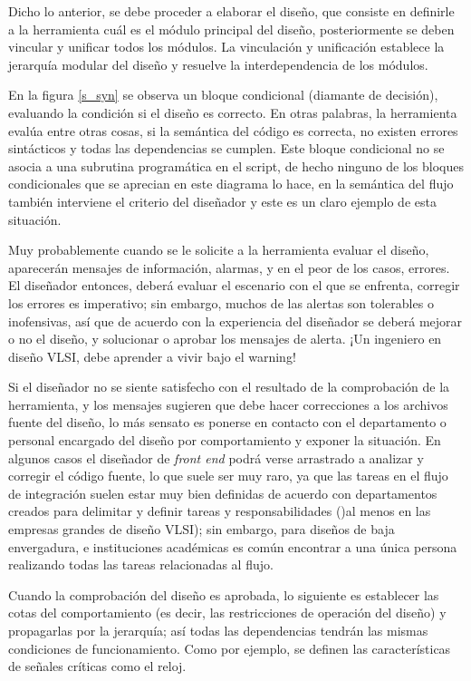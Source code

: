 Dicho lo anterior, se debe proceder a elaborar el diseño, que consiste en definirle a la herramienta cuál es el módulo principal del diseño, posteriormente se deben vincular y unificar todos los módulos. La vinculación y unificación establece la jerarquía modular del diseño y resuelve la interdependencia de los módulos.

En la figura \ref{s_syn} se observa un bloque condicional (diamante de decisión), evaluando la condición si el diseño es correcto. En otras palabras, la herramienta evalúa entre otras cosas, si la semántica del código es correcta, no existen errores sintácticos y todas las dependencias se cumplen. Este bloque condicional no se asocia a una subrutina programática en el script, de hecho ninguno de los bloques condicionales que se aprecian en este diagrama lo hace, en la semántica del flujo también interviene el criterio del diseñador y este es un claro ejemplo de esta situación.

Muy probablemente cuando se le solicite a la herramienta evaluar el diseño, aparecerán mensajes de información, alarmas, y en el peor de los casos, errores. El diseñador entonces, deberá evaluar el escenario con el que se enfrenta, corregir los errores es imperativo; sin embargo, muchos de las alertas son tolerables o inofensivas, así que de acuerdo con la experiencia del diseñador se deberá mejorar o no el diseño, y solucionar o aprobar los mensajes de alerta. ¡Un ingeniero en diseño VLSI, debe aprender a vivir bajo el warning!

Si el diseñador no se siente satisfecho con el resultado de la comprobación de la herramienta, y los mensajes sugieren que debe hacer correcciones a los archivos fuente del diseño, lo más sensato es ponerse en contacto con el departamento o personal encargado del diseño por comportamiento y exponer la situación. En algunos casos el diseñador de \textit{front end} podrá verse arrastrado a analizar y corregir el código fuente, lo que suele ser muy raro, ya que las tareas en el flujo de integración suelen estar muy bien definidas de acuerdo con departamentos creados para delimitar y definir tareas y responsabilidades ()al menos en las empresas grandes de diseño VLSI); sin embargo, para diseños de baja envergadura, e instituciones académicas es común encontrar a una única persona realizando todas las tareas relacionadas al flujo.

Cuando la comprobación del diseño es aprobada, lo siguiente es establecer las cotas del comportamiento (es decir, las restricciones de operación del diseño) y propagarlas por la jerarquía; así todas las dependencias tendrán las mismas condiciones de funcionamiento. Como por ejemplo, se definen las características de señales críticas como el reloj.

